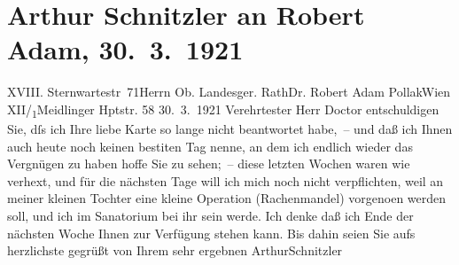 

         
         \renewcommand{\erwaehntePersonen}{Personen: Robert Adam, Lili Schnitzler}
         \renewcommand{\erwaehnteOrte}{Orte: IX., Alsergrund, Meidlinger Hauptstraße, Sanatorium Loew, Sternwartestraße, Wien, XII., Meidling}
         \renewcommand{\erwaehnteWerke}{}
               \section[Arthur Schnitzler an Robert Adam, 30. 3. 1921]{ Arthur Schnitzler an Robert Adam, 30. 3. 1921}\nopagebreak{}\rehead{ }\begin{ledgroupsized}[t]{13cm}\normalsize\beginnumbering{} \toendnotes[C]{\smallbreak\pagebreak[2]} 
\toendnotes[C]{\smallbreak}\pstart{}{\pb}XVIII. Sternwartestr 71\pend{}{\bigskip}\pstart{}Herrn Ob. Landesger. Rath\pend{}\pstart{}Dr. Robert Adam Pollak\pend{}\pstart{}Wien XII/\textsubscript{1}\pend{}\pstart{}Meidlinger Hptstr. 58\pend{}{\bigskip}\pstart
           \raggedleft{}{\pb}30. 3. 1921\pend
           \pstart{}Verehrtester Herr Doctor\pend\pstart
           entschuldigen Sie, dſs ich Ihre liebe Karte so lange nicht beantwortet habe, – und
               daß ich Ihnen auch heute noch keinen besti{\geminationm}ten Tag
               nenne, an dem ich endlich wieder das Vergnügen zu haben hoffe Sie zu sehen; – diese
               letzten Wochen waren wie verhext, und für die nächsten Tage will ich mich noch nicht
               verpflichten, weil an meiner kleinen Tochter eine kleine Operation (Rachenmandel) vorgeno{\geminationm}en werden soll, und ich im Sanatorium bei ihr sein {\pb}werde. Ich denke daß ich Ende der \introOben{}nächsten\introOben{} Woche Ihnen zur Verfügung stehen kann. Bis dahin seien Sie aufs
               herzlichste gegrüßt von Ihrem sehr ergebnen\pend
           \pstart \spacefill\mbox{ArthurSchnitzler}\pend{}
         
         \endnumbering{}\end{ledgroupsized}  \newcommand{\dateiname}{L02365}\newcommand{\titel}{Arthur Schnitzler an Robert Adam, 30. 3. 1921}\newcommand{\editorInnen}{Martin Anton Müller und Gerd-Hermann Susen}
      